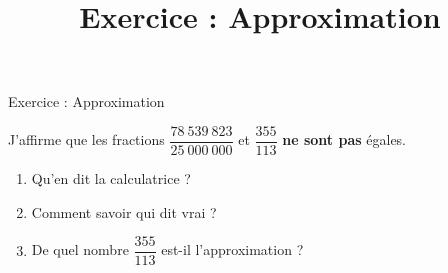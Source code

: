 \documentclass[a4paper,11pt]{beamer}
\title{Exercice : Approximation}
\date{}
\author{}
\begin{document}
\begin{frame}
	\begin{center}
		\LARGE
		Exercice : Approximation
	\end{center}

	\vspace{3em}

	J'affirme que les fractions $\dfrac{78\ 539\ 823}{25\ 000\ 000}$ et $\dfrac{355}{113}$ \textbf{ne sont pas} égales. \vspace{1em}

	\begin{enumerate}
		\item Qu'en dit la calculatrice ?
		\item Comment savoir qui dit vrai ?
		\item De quel nombre $\dfrac{355}{113}$ est-il l'approximation ?
	\end{enumerate}
\end{frame}
\end{document}
